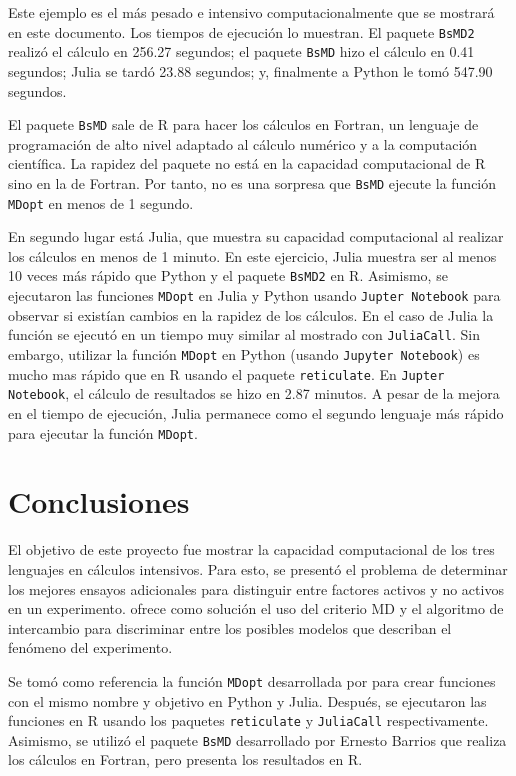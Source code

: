 Este ejemplo es el más pesado e intensivo computacionalmente que se mostrará en este documento. Los tiempos de ejecución lo muestran. El paquete \texttt{BsMD2} realizó el cálculo en 256.27 segundos; el paquete \texttt{BsMD} hizo el cálculo en 0.41 segundos; Julia se tardó 23.88 segundos; y, finalmente a Python le tomó 547.90 segundos.

El paquete \texttt{BsMD} sale de \textsf{R} para hacer los cálculos en \textsf{Fortran}, un lenguaje de programación de alto nivel adaptado al cálculo numérico y a la computación científica. La rapidez del paquete no está en la capacidad computacional de \textsf{R} sino en la de \textsf{Fortran}. Por tanto, no es una sorpresa que \texttt{BsMD} ejecute la función \texttt{MDopt} en menos de 1 segundo. 

En segundo lugar está \textsf{Julia}, que muestra su capacidad computacional al realizar los cálculos en menos de 1 minuto. En este ejercicio, \textsf{Julia} muestra ser al menos 10 veces más rápido que \textsf{Python} y el paquete \texttt{BsMD2} en \textsf{R}. Asimismo, se ejecutaron las funciones \texttt{MDopt} en \textsf{Julia} y \textsf{Python} usando \texttt{Jupter Notebook} para observar si existían cambios en la rapidez de los cálculos. En el caso de \textsf{Julia} la función se ejecutó en un tiempo muy similar al mostrado con \texttt{JuliaCall}. Sin embargo, utilizar la función \texttt{MDopt} en \textsf{Python} (usando \texttt{Jupyter Notebook}) es mucho mas rápido que en \textsf{R} usando el paquete \texttt{reticulate}. En \texttt{Jupter Notebook}, el cálculo de resultados se hizo en 2.87 minutos. A pesar de la mejora en el tiempo de ejecución, \textsf{Julia} permanece como el segundo lenguaje más rápido para ejecutar la función \texttt{MDopt}. 

\section{Conclusiones}

El objetivo de este proyecto fue mostrar la capacidad computacional de los tres lenguajes en cálculos intensivos. Para esto, se presentó el problema de determinar los mejores ensayos adicionales para distinguir entre factores activos y no activos en un experimento. \cite{meyer1996} ofrece como solución el uso del criterio MD y el algoritmo de intercambio para discriminar entre los posibles modelos que describan el fenómeno del experimento. 

Se tomó como referencia la función \texttt{MDopt} desarrollada por \cite{tesis_paty} para crear funciones con el mismo nombre y objetivo en \textsf{Python} y \textsf{Julia}. Después, se ejecutaron las funciones en \textsf{R} usando los paquetes \texttt{reticulate} y \texttt{JuliaCall} respectivamente. Asimismo, se utilizó el paquete \texttt{BsMD} desarrollado por Ernesto Barrios que realiza los cálculos en \textsf{Fortran}, pero presenta los resultados en \textsf{R}. 

